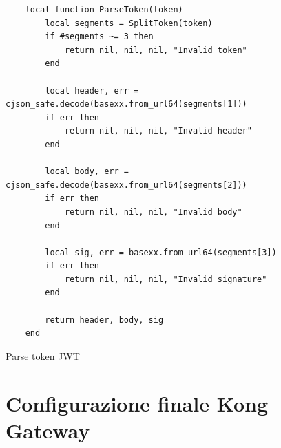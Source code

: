 \begin{algorithm}
\centering
\begin{verbatim}
	local function ParseToken(token)
		local segments = SplitToken(token)
		if #segments ~= 3 then
			return nil, nil, nil, "Invalid token"
		end

		local header, err = cjson_safe.decode(basexx.from_url64(segments[1]))
		if err then
			return nil, nil, nil, "Invalid header"
		end

		local body, err = cjson_safe.decode(basexx.from_url64(segments[2]))
		if err then
			return nil, nil, nil, "Invalid body"
		end

		local sig, err = basexx.from_url64(segments[3])
		if err then
			return nil, nil, nil, "Invalid signature"
		end

		return header, body, sig
	end
\end{verbatim}
\caption{Parse token JWT}\label{alg:parsetoken}
\end{algorithm}



\section{Configurazione finale Kong Gateway}\label{sec:kongconf}